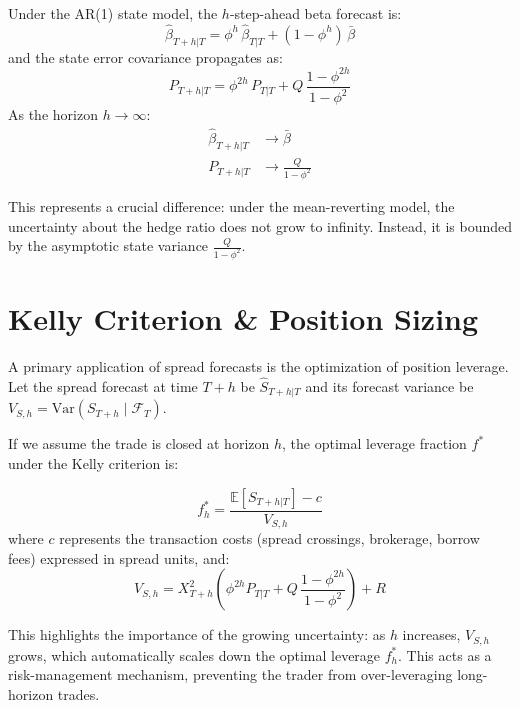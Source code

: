 \documentclass[10pt,a4paper,twocolumn]{article}
\begin{document}
\begin{tcolorbox}[mathbox={Mean-Reverting {h-Step} Projections}]
Under the AR(1) state model, the $h$-step-ahead beta forecast is:
\begin{equation}
  \hat{\beta}_{T+h|T} = \phi^h\,\hat{\beta}_{T|T} + (1 - \phi^h)\,\bar{\beta}
\end{equation}
and the state error covariance propagates as:
\begin{equation}
  P_{T+h|T} = \phi^{2h}\,P_{T|T} + Q\,\frac{1 - \phi^{2h}}{1 - \phi^2}
\end{equation}
As the horizon $h \to \infty$:
\begin{align}
  \hat{\beta}_{T+h|T} &\to \bar{\beta} \\
  P_{T+h|T} &\to \frac{Q}{1 - \phi^2}
\end{align}
\end{tcolorbox}
This represents a crucial difference: under the mean-reverting model, the uncertainty about the hedge ratio does not grow to infinity. Instead, it is bounded by the asymptotic state variance $\frac{Q}{1-\phi^2}$.

\section{Kelly Criterion \& Position Sizing}

A primary application of spread forecasts is the optimization of position leverage. Let the spread forecast at time $T+h$ be $\hat{S}_{T+h|T}$ and its forecast variance be $V_{S, h} = \text{Var}(S_{T+h} \mid \mathcal{F}_T)$. 

If we assume the trade is closed at horizon $h$, the optimal leverage fraction $f^*$ under the Kelly criterion is:
\begin{tcolorbox}[mathbox={Dynamic Kelly Leverage}]
\begin{equation}
  f_h^* = \frac{\mathbb{E}[S_{T+h|T}] - c}{V_{S, h}}
\end{equation}
where $c$ represents the transaction costs (spread crossings, brokerage, borrow fees) expressed in spread units, and:
\[
  V_{S, h} = X_{T+h}^2 \left( \phi^{2h} P_{T|T} + Q\,\frac{1 - \phi^{2h}}{1 - \phi^2} \right) + R
\]
\end{tcolorbox}
This highlights the importance of the growing uncertainty: as $h$ increases, $V_{S, h}$ grows, which automatically scales down the optimal leverage $f_h^*$. This acts as a risk-management mechanism, preventing the trader from over-leveraging long-horizon trades.
\end{document}
